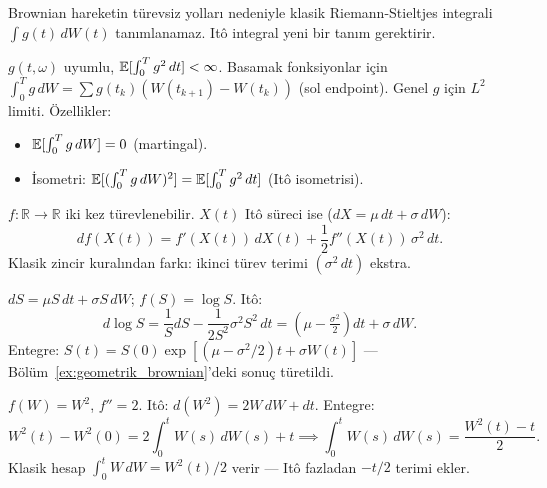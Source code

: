 \begin{kesif}
Brownian hareketin türevsiz yolları nedeniyle klasik Riemann-Stieltjes integrali $\int g(t)\,dW(t)$ tanımlanamaz. Itô integral yeni bir tanım gerektirir.
\end{kesif}

\begin{tanim}\label{def:ito_integral}
$g(t,\omega)$ uyumlu, $\mathbb{E}[\int_0^T g^2\,dt]<\infty$. Basamak fonksiyonlar için $\int_0^T g\,dW = \sum g(t_k)(W(t_{k+1})-W(t_k))$ (sol endpoint). Genel $g$ için $L^2$ limiti. Özellikler:
\begin{itemize}
  \item $\mathbb{E}[\int_0^T g\,dW]=0$ (martingal).
  \item İsometri: $\mathbb{E}[(\int_0^T g\,dW)^2]=\mathbb{E}[\int_0^T g^2\,dt]$ (Itô isometrisi).
\end{itemize}
\end{tanim}

\begin{teorem}\label{thm:ito_formul}
$f:\mathbb{R}\to\mathbb{R}$ iki kez türevlenebilir. $X(t)$ Itô süreci ise ($dX=\mu\,dt+\sigma\,dW$):
\[
  df(X(t)) = f'(X(t))\,dX(t) + \frac{1}{2}f''(X(t))\,\sigma^2\,dt.
\]
Klasik zincir kuralından farkı: ikinci türev terimi $(\sigma^2\,dt)$ ekstra.
\end{teorem}

\begin{ornek}\label{ex:gbm_ito}
$dS=\mu S\,dt+\sigma S\,dW$; $f(S)=\log S$. Itô:
\[
  d\log S = \frac{1}{S}dS - \frac{1}{2S^2}\sigma^2 S^2\,dt = (\mu-\tfrac{\sigma^2}{2})dt+\sigma\,dW.
\]
Entegre: $S(t)=S(0)\exp[(\mu-\sigma^2/2)t+\sigma W(t)]$ --- Bölüm~\ref{ex:geometrik_brownian}'deki sonuç türetildi.
\end{ornek}

\begin{ornek}[$W^2(t)$ hesabı]\label{ex:w2_ito}
$f(W)=W^2$, $f''=2$. Itô: $d(W^2)=2W\,dW+dt$. Entegre:
\[
  W^2(t)-W^2(0)=2\int_0^t W(s)\,dW(s)+t \implies \int_0^t W(s)\,dW(s)=\frac{W^2(t)-t}{2}.
\]
Klasik hesap $\int_0^t W\,dW = W^2(t)/2$ verir --- Itô fazladan $-t/2$ terimi ekler.
\end{ornek}


